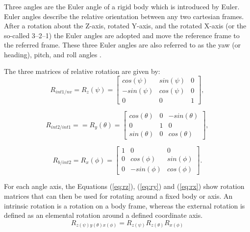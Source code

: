 Three angles are the Euler angle of a rigid body which is introduced by Euler. Euler angles describe the relative orientation between any two cartesian frames. After a rotation about the Z-axis, rotated Y-axis, and the rotated X-axis (or the so-called 3–2–1) the Euler angles are adopted and move the reference frame to the referred frame. These three Euler angles are also referred to as the yaw (or heading), pitch, and roll angles \cite{cai_coordinate_2011}.

The three matrices of relative rotation are given by:
\begin{equation}
  R_{int1/nv} = R_{z}(\psi) = \begin{bmatrix}
cos(\psi) & sin(\psi) & 0\\ 
-sin(\psi) & cos(\psi) & 0 \\ 
0 & 0 & 1
\end{bmatrix},
\end{equation}\label{eq:rz}

\begin{equation}
  R_{int2/int1} = = R_{y}(\theta) = \begin{bmatrix}
cos(\theta) & 0 & -sin(\theta)\\ 
0 & 1 & 0 \\
sin(\theta) & 0 & cos(\theta)
\end{bmatrix},
\end{equation}\label{eq:ry}

\begin{equation}
  R_{b/int2} = R_{x}(\phi) =\begin{bmatrix}
1 & 0 & 0\\ 
0 & cos(\phi) & sin(\phi) \\ 
0 & -sin(\phi) & cos(\phi)
\end{bmatrix}.
\end{equation}\label{eq:rx}


For each angle axis, the Equations (\ref{eq:rz}), (\ref{eq:ry}) and (\ref{eq:rx}) show rotation matrices that can then be used for rotating around a fixed body or axis. An intrinsic rotation is a rotation on a body frame, whereas the external rotation is defined as an elemental rotation around a defined coordinate axis.
\begin{equation}
  R_{z(\psi)y(\theta)x(\phi)} = R_{z(\psi)} R_{z(\theta)}R_{x(\phi)}
\end{equation}


